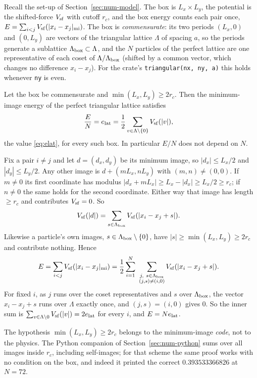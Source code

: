 Recall the set-up of Section~\ref{sec:num-model}. The box is $L_x\times L_y$, the potential is the shifted-force
$V_{\rm sf}$ with cutoff $r_c$, and the box energy counts each pair once, $E=\sum_{i<j}V_{\rm sf}(|x_i-x_j|_{\rm mi})$.
The box is \emph{commensurate}: its two periods $(L_x,0)$ and $(0,L_y)$ are vectors of the triangular lattice
$\Lambda$ of spacing $a$, so the periods generate a sublattice $\Lambda_{\rm box}\subset\Lambda$, and the $N$ particles
of the perfect lattice are one representative of each coset of $\Lambda/\Lambda_{\rm box}$ (shifted by a common
vector, which changes no difference $x_i-x_j$). For the crate's \texttt{triangular(nx, ny, a)} this holds whenever
\texttt{ny} is even.

\begin{proposition}\label{fss:prop:box}
Let the box be commensurate and $\min(L_x,L_y)\ge2r_c$. Then the minimum-image energy of the perfect triangular lattice
satisfies
\[
\frac{E}{N}=e_{\rm lat}=\frac12\sum_{v\in\Lambda\setminus\{0\}}V_{\rm sf}(|v|),
\]
the value \eqref{eq:elat}, for every such box. In particular $E/N$ does not depend on $N$.
\end{proposition}
\begin{humanproof}
\tierC{} Fix a pair $i\ne j$ and let $d=(d_x,d_y)$ be its minimum image, so $|d_x|\le L_x/2$ and $|d_y|\le L_y/2$. Any
other image is $d+(mL_x,nL_y)$ with $(m,n)\ne(0,0)$. If $m\ne0$ its first coordinate has modulus
$|d_x+mL_x|\ge L_x-|d_x|\ge L_x/2\ge r_c$; if $n\ne0$ the same holds for the second coordinate. Either way that image
has length $\ge r_c$ and contributes $V_{\rm sf}=0$. So
\[
V_{\rm sf}(|d|)=\sum_{s\in\Lambda_{\rm box}}V_{\rm sf}(|x_i-x_j+s|).
\]
Likewise a particle's own images, $s\in\Lambda_{\rm box}\setminus\{0\}$, have $|s|\ge\min(L_x,L_y)\ge2r_c$ and contribute
nothing. Hence
\[
E=\sum_{i<j}V_{\rm sf}(|x_i-x_j|_{\rm mi})=\frac12\sum_{i=1}^N\ \sum_{\substack{j,\ s\in\Lambda_{\rm box}\\(j,s)\ne(i,0)}}V_{\rm sf}(|x_i-x_j+s|).
\]
For fixed $i$, as $j$ runs over the coset representatives and $s$ over $\Lambda_{\rm box}$, the vector $x_i-x_j+s$ runs
over $\Lambda$ exactly once, and $(j,s)=(i,0)$ gives $0$. So the inner sum is $\sum_{v\in\Lambda\setminus0}V_{\rm sf}(|v|)
=2e_{\rm lat}$ for every $i$, and $E=Ne_{\rm lat}$.
\end{humanproof}

The hypothesis $\min(L_x,L_y)\ge2r_c$ belongs to the minimum-image \emph{code}, not to the physics. The Python companion
of Section~\ref{sec:num-python} sums over all images inside $r_c$, including self-images; for that scheme the same
proof works with no condition on the box, and indeed it printed the correct $0.393533366826$ at $N=72$.

